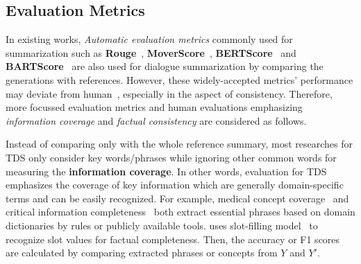 \subsection{Evaluation Metrics}
\label{sec:evalmetric}
In existing works, \textit{Automatic evaluation metrics} commonly used for summarization such as \textbf{Rouge}~\cite{lin2004rouge}, \textbf{MoverScore}~\cite{zhao2019moverscore}, \textbf{BERTScore}~\cite{zhang2019bertscore} and \textbf{BARTScore}~\cite{yuan2021bartscore} are also used for dialogue summarization by comparing the generations with references. However, these widely-accepted metrics' performance may deviate from human~\cite{chen2021dialsumm,hanna2021fine}, especially in the aspect of consistency. Therefore, more focussed evaluation metrics and human evaluations emphasizing \textit{information coverage} and \textit{factual consistency} are considered as follows.

Instead of comparing only with the whole reference summary, most researches for TDS only consider key words/phrases
while ignoring other common words for measuring the \textbf{information coverage}.  In other words, evaluation for TDS emphasizes the coverage of key information which are generally domain-specific terms and can be easily recognized.
For example, {medical concept coverage}~\cite{joshi2020dr,zhang2021leveraging} 
and {critical information completeness}~\cite{yuan2019scaffolds} both
extract essential phrases based on domain dictionaries by 
rules or publicly available tools. 
\citet{zhao2021give} uses slot-filling model~\cite{chen2019bert} to recognize slot values for {factual completeness}.
Then, the accuracy or F1 scores are 
calculated by comparing extracted phrases or concepts from $Y$ and $Y'$. 




